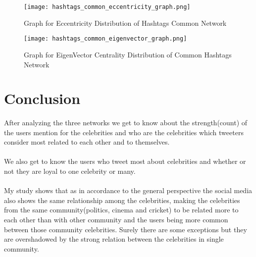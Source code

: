 \documentclass[runningheads,a4paper]{llncs}
\begin{document}
\begin{figure}
\centerline{\texttt{[image: hashtags\_common\_eccentricity\_graph.png]}}
\caption{Graph for Eccentricity Distribution of Hashtags Common Network}
\vspace{0.1in}
\centerline{}
\end{figure}

\begin{figure}
\centerline{\texttt{[image: hashtags\_common\_eigenvector\_graph.png]}}
\caption{Graph for EigenVector Centrality Distribution of Common Hashtags Network}
\vspace{0.1in}
\centerline{}
\end{figure}

\section{Conclusion}

\paragraph{}
After analyzing the three networks we get to know about the strength(count) of the users mention for the celebrities and who are the celebrities which tweeters consider most related to each other and to themselves.

\paragraph{}
We also get to know the users who tweet most about celebrities and whether or not they are loyal to one celebrity or many.

\paragraph{}
My study shows that as in accordance to the general perspective the social media also shows the same relationship among the celebrities, making the celebrities from the same community(politics, cinema and cricket) to be related more to each other than with other community and the users being more common between those community celebrities. Surely there are some exceptions but they are overshadowed by the strong relation between the celebrities in single community.
\end{document}
